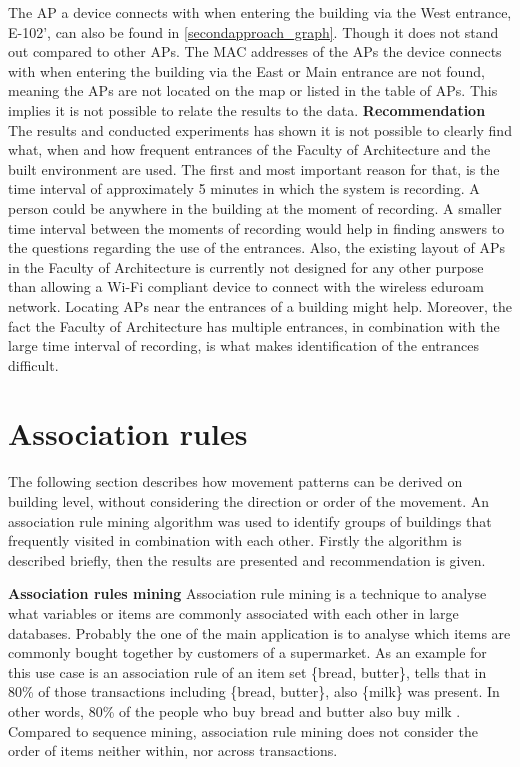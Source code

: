 The AP a device connects with when entering the building via the West entrance, E-102', can also be found in \autoref{secondapproach_graph}. Though it does not stand out compared to other APs. The MAC addresses of the APs the device connects with when entering the building via the East or Main entrance are not found, meaning the APs are not located on the map or listed in the table of APs. This implies it is not possible to relate the results to the data. 
\textbf{Recommendation}
The results and conducted experiments has shown it is not possible to clearly find what, when and how frequent entrances of the Faculty of Architecture and the built environment are used. The first and most important reason for that, is the time interval of approximately 5 minutes in which the system is recording. A person could be anywhere in the building at the moment of recording. A smaller time interval between the moments of recording would help in finding answers to the questions regarding the use of the entrances. Also, the existing layout of APs in the Faculty of Architecture is currently not designed for any other purpose than allowing a Wi-Fi compliant device to connect with the wireless eduroam network. Locating APs near the entrances of a building might help. Moreover, the fact the Faculty of Architecture has multiple entrances, in combination with the large time interval of recording, is what makes identification of the entrances difficult. 

\section{Association rules} 
The following section describes how movement patterns can be derived on building level, without considering the direction or order of the movement. An association rule mining algorithm \cite{agrawal_mining_1993} was used to identify groups of buildings that frequently visited in combination with each
other. Firstly the algorithm is described briefly, then the results are presented and recommendation is given.

\textbf{Association rules mining}
Association rule mining is a technique to analyse what variables or items are
commonly associated with each other in large databases. Probably the one of the
main application is to analyse which items are commonly bought together by
customers of a supermarket. As an example for this use case is an association
rule of an item set \{bread, butter\}, tells that in 80\% of those transactions
including \{bread, butter\}, also \{milk\}  was present. In other words, 80\%
of the people who buy bread and butter also buy milk
\cite{agrawal_mining_1993}. Compared to sequence mining, association rule
mining does not consider the order of items neither within, nor across transactions.


